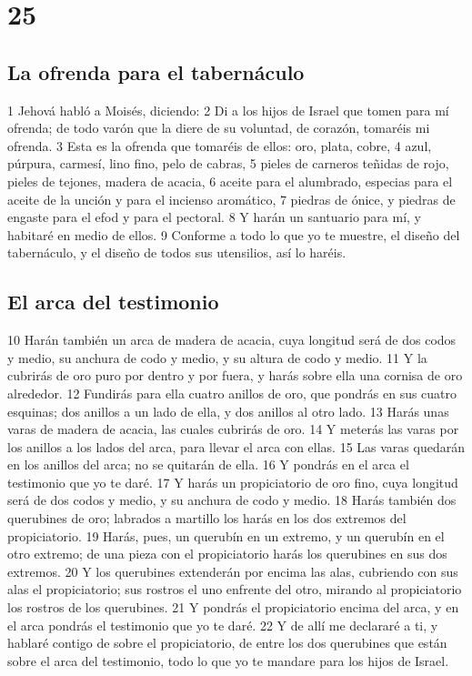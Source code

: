 \chapter{25}

\section*{La ofrenda para el tabernáculo}

1 Jehová habló a Moisés, diciendo:
2 Di a los hijos de Israel que tomen para mí ofrenda; de todo varón que la diere de su voluntad, de corazón, tomaréis mi ofrenda.
3 Esta es la ofrenda que tomaréis de ellos: oro, plata, cobre,
4 azul, púrpura, carmesí, lino fino, pelo de cabras,
5 pieles de carneros teñidas de rojo, pieles de tejones, madera de acacia,
6 aceite para el alumbrado, especias para el aceite de la unción y para el incienso aromático,
7 piedras de ónice, y piedras de engaste para el efod y para el pectoral.
8 Y harán un santuario para mí, y habitaré en medio de ellos.
9 Conforme a todo lo que yo te muestre, el diseño del tabernáculo, y el diseño de todos sus utensilios, así lo haréis.

\section*{El arca del testimonio}

10 Harán también un arca de madera de acacia, cuya longitud será de dos codos   y medio, su anchura de codo y medio, y su altura de codo y medio.
11 Y la cubrirás de oro puro por dentro y por fuera, y harás sobre ella una cornisa de oro alrededor.
12 Fundirás para ella cuatro anillos de oro, que pondrás en sus cuatro esquinas; dos anillos a un lado de ella, y dos anillos al otro lado.
13 Harás unas varas de madera de acacia, las cuales cubrirás de oro.
14 Y meterás las varas por los anillos a los lados del arca, para llevar el arca con ellas.
15 Las varas quedarán en los anillos del arca; no se quitarán de ella.
16 Y pondrás en el arca el testimonio que yo te daré.
17 Y harás un propiciatorio de oro fino, cuya longitud será de dos codos   y medio, y su anchura de codo y medio.
18 Harás también dos querubines de oro; labrados a martillo los harás en los dos extremos del propiciatorio.
19 Harás, pues, un querubín en un extremo, y un querubín en el otro extremo; de una pieza con el propiciatorio harás los querubines en sus dos extremos.
20 Y los querubines extenderán por encima las alas, cubriendo con sus alas el propiciatorio; sus rostros el uno enfrente del otro, mirando al propiciatorio los rostros de los querubines.
21 Y pondrás el propiciatorio encima del arca, y en el arca pondrás el testimonio que yo te daré.
22 Y de allí me declararé a ti, y hablaré contigo de sobre el propiciatorio, de entre los dos querubines que están sobre el arca del testimonio, todo lo que yo te mandare para los hijos de Israel.

